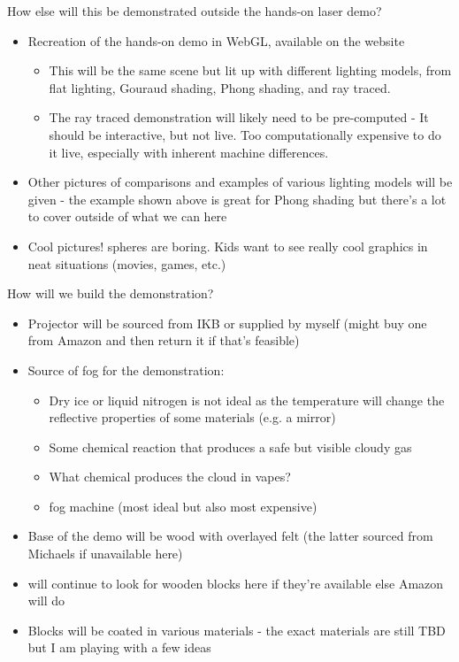 \documentclass{beamer}
\begin{document}
  \begin{frame}{How else will this be demonstrated outside the hands-on laser demo?}

    \begin{itemize}
      \item Recreation of the hands-on demo in WebGL, available on the website
      \begin{itemize}
        \item This will be the same scene but lit up with different lighting models, from flat lighting, Gouraud shading, Phong shading, and ray traced.
        \item The ray traced demonstration will likely need to be pre-computed - It should be interactive, but not live.
        Too computationally expensive to do it live, especially with inherent machine differences.
      \end{itemize}
      \item Other pictures of comparisons and examples of various lighting models will be given - the example shown above is great for Phong shading but there's a lot to cover outside of what we can here
      \item Cool pictures!
      spheres are boring.
      Kids want to see really cool graphics in neat situations (movies, games, etc.)
    \end{itemize}

  \end{frame}

  \begin{frame}{How will we build the demonstration?}
    \begin{itemize}
      \item Projector will be sourced from IKB or supplied by myself (might buy one from Amazon and then return it if that's feasible)
      \item Source of fog for the demonstration:
      \begin{itemize}
        \item Dry ice or liquid nitrogen is not ideal as the temperature will change the reflective properties of some materials (e.g. a mirror)
        \item Some chemical reaction that produces a safe but visible cloudy gas
        \item What chemical produces the cloud in vapes?
        \item fog machine (most ideal but also most expensive)
      \end{itemize}
      \item Base of the demo will be wood with overlayed felt (the latter sourced from Michaels if unavailable here)
      \item will continue to look for wooden blocks here if they're available else Amazon will do
      \item Blocks will be coated in various materials - the exact materials are still TBD but I am playing with a few ideas
    \end{itemize}

  \end{frame}
\end{document}
